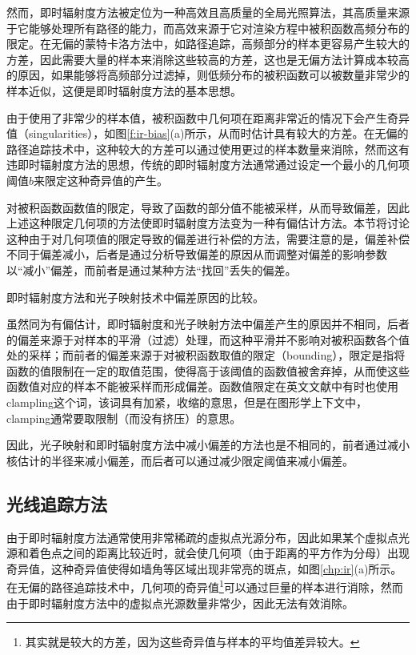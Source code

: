 然而，即时辐射度方法被定位为一种高效且高质量的全局光照算法，其高质量来源于它能够处理所有路径的能力，而高效来源于它对渲染方程中被积函数高频分布的限定。在无偏的蒙特卡洛方法中，如路径追踪，高频部分的样本更容易产生较大的方差，因此需要大量的样本来消除这些较高的方差，这也是无偏方法计算成本较高的原因，如果能够将高频部分过滤掉，则低频分布的被积函数可以被数量非常少的样本近似，这便是即时辐射度方法的基本思想。

由于使用了非常少的样本值，被积函数中几何项在距离非常近的情况下会产生奇异值（singularities），如图\ref{f:ir-bias}(a)所示，从而时估计具有较大的方差。在无偏的路径追踪技术中，这种较大的方差可以通过使用更过的样本数量来消除，然而这有违即时辐射度方法的思想，传统的即时辐射度方法\cite{a:InstantRadiosity}通常通过设定一个最小的几何项阈值$b$来限定这种奇异值的产生。

对被积函数函数值的限定，导致了函数的部分值不能被采样，从而导致偏差，因此上述这种限定几何项的方法使即时辐射度方法变为一种有偏估计方法。本节将讨论这种由于对几何项值的限定导致的偏差进行补偿的方法，需要注意的是，偏差补偿不同于偏差减小，后者是通过分析导致偏差的原因从而调整对偏差的影响参数以“减小”偏差，而前者是通过某种方法“找回”丢失的偏差。

\begin{myshaded}
	\indent 即时辐射度方法和光子映射技术中偏差原因的比较。
	
	\indent 虽然同为有偏估计，即时辐射度和光子映射方法中偏差产生的原因并不相同，后者的偏差来源于对样本的平滑（过滤）处理，而这种平滑并不影响对被积函数各个值处的采样；而前者的偏差来源于对被积函数取值的限定（bounding），限定是指将函数的值限制在一定的取值范围，使得高于该阈值的函数值被舍弃掉，从而使这些函数值对应的样本不能被采样而形成偏差。函数值限定在英文文献中有时也使用clampling这个词，该词具有加紧，收缩的意思，但是在图形学上下文中，clamping通常要取限制（而没有挤压）的意思。
	
	\indent 因此，光子映射和即时辐射度方法中减小偏差的方法也是不相同的，前者通过减小核估计的半径来减小偏差，而后者可以通过减少限定阈值来减小偏差。
\end{myshaded}





\subsection{光线追踪方法}
由于即时辐射度方法通常使用非常稀疏的虚拟点光源分布，因此如果某个虚拟点光源和着色点之间的距离比较近时，就会使几何项（由于距离的平方作为分母）出现奇异值，这种奇异值使得如墙角等区域出现非常亮的斑点，如图\ref{chp:ir}(a)所示。在无偏的路径追踪技术中，几何项的奇异值\footnote{其实就是较大的方差，因为这些奇异值与样本的平均值差异较大。}可以通过巨量的样本进行消除，然而由于即时辐射度方法中的虚拟点光源数量非常少，因此无法有效消除。

